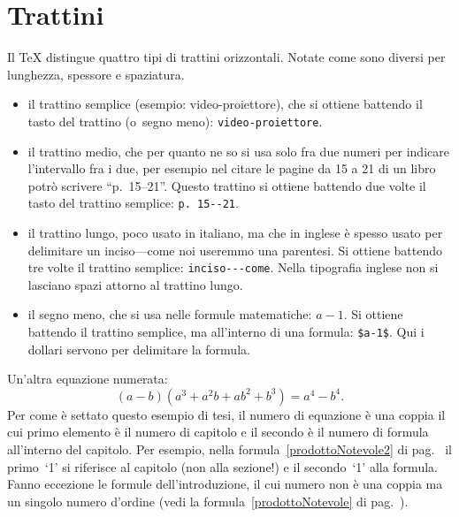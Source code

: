 \section{Trattini}

Il \TeX{} distingue quattro tipi di trattini
orizzontali. Notate come sono diversi per lunghezza,
spessore e spaziatura.

\begin{itemize}

\item il trattino semplice (esempio:
video-proiettore), che si ottiene battendo il tasto del
trattino (o~segno meno): \verb!video-proiettore!.

\item il trattino medio, che per quanto ne so si usa
solo fra due numeri per indicare l'intervallo fra i due,
per esempio nel citare le pagine da 15 a 21 di un libro
potr\`o scrivere ``p.~15--21''. Questo trattino si
ottiene battendo due volte il tasto del trattino semplice:
\verb!p. 15--21!.

\item il trattino lungo, poco usato in italiano, ma che
in inglese \`e spesso usato per delimitare un
inciso---come noi useremmo una parentesi. Si ottiene
battendo tre volte il trattino semplice:
\verb!inciso---come!. Nella tipografia inglese non si
lasciano spazi attorno al trattino lungo.

\item il segno meno, che si usa nelle formule
matematiche: $a-1$. Si ottiene battendo il trattino
semplice, ma all'interno di una formula: \verb!$a-1$!.
Qui i dollari servono per delimitare la formula.

\end{itemize}

Un'altra equazione numerata:
\begin{equation}
  (a-b)(a^3+a^2b+ab^2+b^3)=a^4-b^4.
\end{equation}
Per come \`e settato questo esempio di tesi, il numero di equazione \`e una coppia il cui primo elemento \`e il numero di capitolo e il secondo \`e il numero di formula all'interno del capitolo. Per esempio, nella formula~\eqref{prodottoNotevole2} di pag.~\pageref{prodottoNotevole2} il primo~`1' si riferisce al capitolo (non alla sezione!) e il secondo~`1' alla formula. Fanno eccezione le formule dell'introduzione, il cui numero non \`e una coppia ma un singolo numero d'ordine (vedi la formula~\eqref{prodottoNotevole} di pag.~\pageref{prodottoNotevole}).


